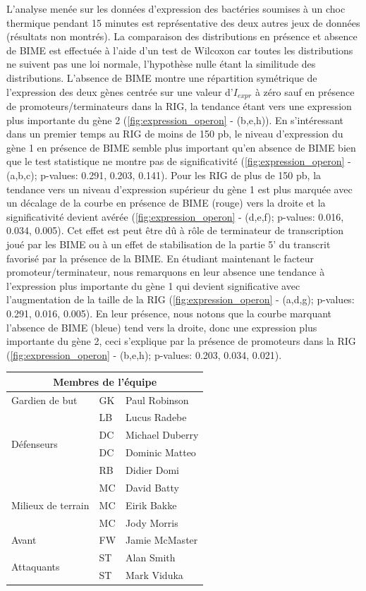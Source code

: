 \documentclass[12pt,a4paper]{report}
\begin{document}
\begin{onehalfspace}
L'analyse menée sur les données d'expression des bactéries soumises à un choc thermique pendant 15 minutes est représentative des deux autres jeux de données (résultats non montrés). La comparaison des distributions en présence et absence de BIME est effectuée à l'aide d'un test de Wilcoxon car toutes les distributions ne suivent pas une loi normale, l'hypothèse nulle étant la similitude des distributions. L'absence de BIME montre une répartition symétrique de l'expression des deux gènes centrée sur une valeur d'$I_{expr}$ à zéro sauf en présence de promoteurs/terminateurs dans la RIG, la tendance étant vers une expression plus importante du gène 2 (\autoref{fig:expression_operon} - (b,e,h)).
En s'intéressant dans un premier temps au RIG de moins de 150 pb, le niveau d'expression du gène 1 en présence de BIME semble plus important qu'en absence de BIME bien que le test statistique ne montre pas de significativité (\autoref{fig:expression_operon} - (a,b,c); p-values: 0.291, 0.203, 0.141). Pour les RIG de plus de 150 pb, la tendance vers un niveau d'expression supérieur du gène 1 est plus marquée avec un décalage de la courbe en présence de BIME (rouge) vers la droite et la significativité devient avérée (\autoref{fig:expression_operon} - (d,e,f); p-values: 0.016, 0.034, 0.005). Cet effet est peut être dû à rôle de terminateur de transcription joué par les BIME ou à un effet de stabilisation de la partie 5' du transcrit favorisé par la présence de la BIME.
En étudiant maintenant le facteur promoteur/terminateur, nous remarquons en leur absence une tendance à l'expression plus importante du gène 1 qui devient significative avec l'augmentation de la taille de la RIG (\autoref{fig:expression_operon} - (a,d,g); p-values: 0.291, 0.016, 0.005). En leur présence, nous notons que la courbe marquant l'absence de BIME (bleue) tend vers la droite, donc une expression plus importante du gène 2, ceci s'explique par la présence de promoteurs dans la RIG (\autoref{fig:expression_operon} - (b,e,h); p-values: 0.203, 0.034, 0.021).



\begin{tabular}{|l|l|l|}
  \hline
  \multicolumn{3}{|c|}{Membres de l'équipe} \\
  \hline
  Gardien de but & GK & Paul Robinson \\ \hline
  \multirow{4}{*}{Défenseurs} & LB & Lucus Radebe \\
    & DC & Michael Duberry \\
    & DC & Dominic Matteo \\
    & RB & Didier Domi \\ \hline
  \multirow{3}{*}{Milieux de terrain } & MC & David Batty \\
    & MC & Eirik Bakke \\
    & MC & Jody Morris \\ \hline
  Avant & FW & Jamie McMaster \\ \hline
  \multirow{2}{*}{Attaquants} & ST & Alan Smith \\
    & ST & Mark Viduka \\
 \hline
\end{tabular}


\end{onehalfspace}
\end{document}
